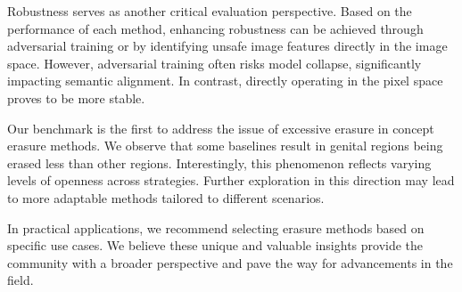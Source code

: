 

Robustness serves as another critical evaluation perspective. Based on the performance of each method, enhancing robustness can be achieved through adversarial training or by identifying unsafe image features directly in the image space. However, adversarial training often risks model collapse, significantly impacting semantic alignment. In contrast, directly operating in the pixel space proves to be more stable.

Our benchmark is the first to address the issue of excessive erasure in concept erasure methods. 
We observe that some baselines result in genital regions being erased less than other regions. Interestingly, this phenomenon reflects varying levels of openness across strategies. Further exploration in this direction may lead to more adaptable methods tailored to different scenarios.

In practical applications, we recommend selecting erasure methods based on specific use cases. We believe these unique and valuable insights provide the community with a broader perspective and pave the way for advancements in the field.

